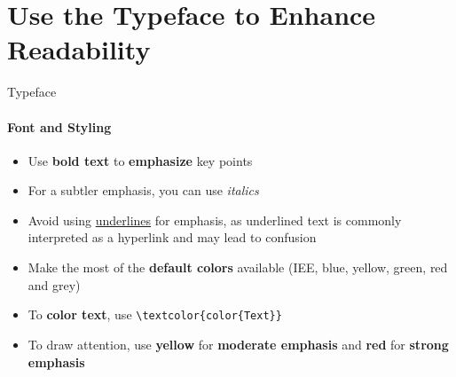 \documentclass[aspectratio=169]{beamer}
\begin{document}
\section{Use the \textbf{Typeface} to Enhance Readability}

\begin{frame}
\end{frame}

\begin{frame}{Typeface}
    \framesubtitle{Font and Styling}

    \begin{coloredblock}
        \begin{itemize}
            \item Use \textbf{bold text} to \textbf{emphasize} key points
            \item For a subtler emphasis, you can use \textit{italics}
            \item Avoid using \underline{underlines} for emphasis, as underlined text is commonly interpreted as a hyperlink and may lead to confusion
        \end{itemize}
    \end{coloredblock}

    \begin{coloredblock}
            \begin{itemize}
                \item Make the most of the \textbf{default colors} available (IEE, blue, yellow, green, red and grey)
                \item To \textbf{color text}, use \texttt{\textbackslash textcolor\{color\{Text\}\}}
                \item To draw attention, use \textbf{yellow} for \textbf{moderate emphasis} and \textbf{red} for \textbf{strong emphasis}
            \end{itemize}
    \end{coloredblock}
    
\end{frame}
\end{document}
